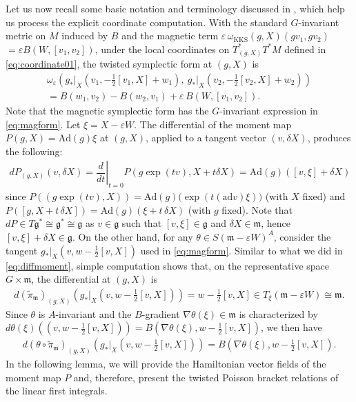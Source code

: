 \documentclass[11pt]{amsart}
\theoremstyle{definition}
\theoremstyle{plain}
\theoremstyle{conclusion}
\begin{document}
 Let us now recall some basic notation and terminology discussed in \cite{MR2141306}, which help us process the explicit coordinate computation.  %
 With the standard $G$-invariant metric on $M$ induced by $B$ and the magnetic term $\varepsilon\,\omega_{\mathrm{KKS}}(g,X)(gv_1,gv_2) $ $=\varepsilon B(W,[v_1,v_2])$, under the local coordinates on $T_{(g,X)}^*T^*M$ defined in \eqref{eq:coordinate01}, the twisted symplectic form at $(g,X)$ is \begin{align}
 \nonumber
\omega_{\varepsilon}\left(g_*\vert_X\left(v_1,-\frac{1}{2}[v_1,X]+w_1\right),\ g_*\vert_X\left(v_2,-\frac{1}{2}[v_2,X]+w_2\right)\right)  \\
= B(w_1,v_2)-B(w_2,v_1)+\varepsilon\,B(W,[v_1,v_2]). \label{eq:magform}
\end{align} Note that the magnetic symplectic form has the $G$-invariant expression in \eqref{eq:magform}. Let $\xi = X - \varepsilon W$. The differential of the moment map $P(g,X)=\mathrm{Ad}(g)\xi$ at $(g,X)$, applied to a tangent vector $(v,\delta X)$, produces the following: \begin{align}
  d P_{(g,X)}(v,\delta X)=  \left. \dfrac{d}{dt} \right\vert_{t= 0} P(g \exp(tv),X +  t \delta X) = \mathrm{Ad}(g)([v,\xi] +  \delta X) \label{eq:diffmoment}
\end{align}   since $P((g \exp(tv),X))=\mathrm{Ad}(g)\bigl(\exp(t( \mathrm{ad}v)\xi)\bigr)$ (with $X$ fixed) and $P([g,X+t\,\delta X])=\mathrm{Ad}(g)(\xi+t\,\delta X)$ (with $g$ fixed). Note that $d P \in T\mathfrak{g}^* \cong \mathfrak{g}^* \cong \mathfrak{g}$ as $v \in \mathfrak{g}$ such that $[v,\xi] \in \mathfrak{g}$ and $\delta X \in \mathfrak{m}$, hence $[v,\xi] +  \delta X \in \mathfrak{g}$. On the other hand, for any $\theta \in S(\mathfrak{m} - \varepsilon W)^A$, consider the tangent $g_*\vert_X\left(v, w - \frac{1}{2}[v,X]\right)$ used in \eqref{eq:magform}. Similar to what we did in \eqref{eq:diffmoment}, simple computation shows that, on the representative space $G\times\mathfrak{m}$, the differential at $(g,X)$ is \begin{align*}
    d (\widetilde{\pi}_\mathfrak{m})_{(g,X)} \left(g_*\vert_X\left(v, w - \frac{1}{2}[v,X]\right)\right) =   w - \frac{1}{2}[v,X] \in T_\xi(\mathfrak{m} - \varepsilon W) \cong \mathfrak{m}.
\end{align*}   Since $\theta$ is $A$-invariant and the $B$-gradient $\nabla \theta(\xi) \in \mathfrak{m}$ is characterized by  $d \theta(\xi) \left( \left(v, w - \frac{1}{2}[v,X]\right)\right) = B(\nabla \theta(\xi),w - \frac{1}{2}[v,X] )$, we then have \begin{align}
    d (\theta \circ \widetilde{\pi}_\mathfrak{m})_{(g,X)}\left(g_*\vert_X \left(v, w - \frac{1}{2}[v,X]\right)\right)  = B\left(\nabla \theta(\xi),w - \frac{1}{2}[v,X] \right). \label{eq:diffproj}
\end{align} In the following lemma, we will provide the Hamiltonian vector fields of the moment map $P$ and, therefore, present the twisted Poisson bracket relations of the linear first integrals.
\end{document}
